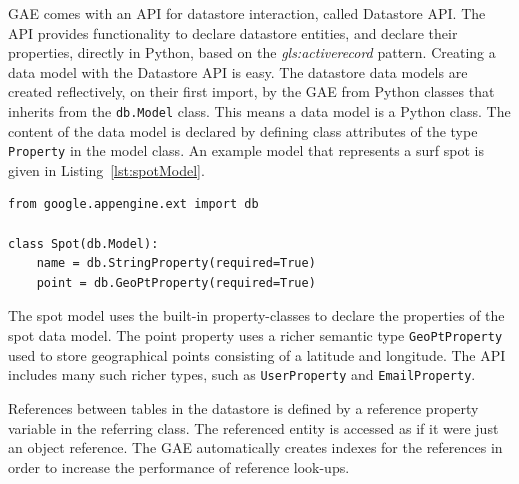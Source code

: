 GAE comes with an API for datastore interaction, called Datastore API. The API
provides functionality to declare datastore entities, and declare their
properties, directly in Python, based on the \textit{\gls{gls:activerecord}}
pattern. Creating a data model with the Datastore API is easy. The datastore data
models are created reflectively, on their first import, by the GAE from Python
classes that inherits from the \verb|db.Model| class. This means a data model is
a Python class. The content of the data model is declared by defining class
attributes of the type \verb|Property| in the model class. An example model that
represents a surf spot is given in Listing~\ref{lst:spotModel}.

\lstset{language=Python}
\begin{lstlisting}[caption=Spot model,label=lst:spotModel]
from google.appengine.ext import db

class Spot(db.Model):
    name = db.StringProperty(required=True)
    point = db.GeoPtProperty(required=True)
\end{lstlisting}

The spot model uses the built-in property-classes to declare the properties of
the spot data model. The point property uses a richer semantic type
\verb|GeoPtProperty| used to store geographical points consisting of a latitude
and longitude. The API includes many such richer types, such as \verb|UserProperty|
and \verb|EmailProperty|.

References between tables in the datastore is defined by a reference property
variable in the referring class. The referenced entity is accessed as if it were
just an object reference. The GAE automatically creates indexes for the
references in order to increase the performance of reference look-ups.

